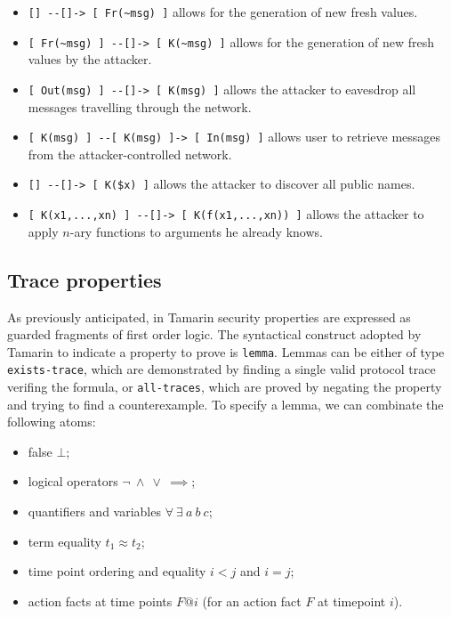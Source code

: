 \documentclass[fleqn,10pt]{SelfArx} %
\begin{document}
\begin{itemize}
    \item \lstinline|[] --[]-> [ Fr(~msg) ]| allows for the generation of new fresh values.
    \item \lstinline|[ Fr(~msg) ] --[]-> [ K(~msg) ]| allows for the generation of new fresh values by the attacker.
    \item \lstinline|[ Out(msg) ] --[]-> [ K(msg) ]| allows the attacker to eavesdrop all messages travelling through the network. 
    \item \lstinline|[ K(msg) ] --[ K(msg) ]-> [ In(msg) ]| allows user to retrieve messages from the attacker-controlled network.
    \item \lstinline|[] --[]-> [ K($x) ]| allows the attacker to discover all public names.
    \item \lstinline|[ K(x1,...,xn) ] --[]-> [ K(f(x1,...,xn)) ]| allows the attacker to apply $n$-ary functions to arguments he already knows.
\end{itemize}

\subsection{Trace properties}\label{subsec:TraceProperties}

As previously anticipated, in Tamarin security properties are expressed as guarded fragments of first order logic. The syntactical construct adopted by Tamarin to indicate a property to prove is \lstinline|lemma|. Lemmas can be either of type \lstinline|exists-trace|, which are demonstrated by finding a single valid protocol trace verifing the formula, or \lstinline|all-traces|, which are proved by negating the property and trying to find a counterexample. To specify a lemma, we can combinate the following atoms:

\begin{itemize}
    \item false $\bot$;
    \item logical operators $\neg\  \wedge\  \vee\ \implies$;
    \item quantifiers and variables $\forall\ \exists\ a\ b\ c$;
    \item term equality $t_1 \approx t_2$;
    \item time point ordering and equality $i < j$ and $i = j$;
    \item action facts at time points $F @ i$ (for an action fact $F$ at timepoint $i$).
\end{itemize}
\end{document}
